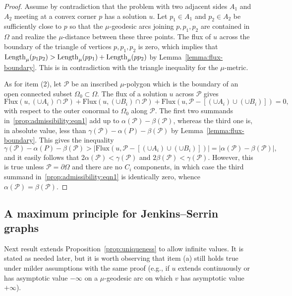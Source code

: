 \documentclass[a4paper,10pt,reqno]{amsart}
\newcommand{\Length}{\mathop{\rm Length}\nolimits}
\newcommand{\Flux}{\mathrm{Flux}}
\newcommand{\sm}{-}
\theoremstyle{definition}
\theoremstyle{remark}
\numberwithin{equation}{section}
\begin{document}
\begin{proof}
Assume by contradiction that the problem with two adjacent sides $A_1$ and $A_2$ meeting at a convex corner $p$ has a solution $u$. Let $p_1\in A_1$ and $p_2\in A_2$ be sufficiently close to $p$ so that the $\mu$-geodesic arcs joining $p,p_1,p_2$ are contained in $\Omega$ and realize the $\mu$-distance between these three points. The flux of $u$ across the boundary of the triangle of vertices $p,p_1,p_2$ is zero, which implies that $\Length_\mu(p_1p_2)>\Length_\mu(pp_1)+\Length_\mu(pp_2)$ by Lemma~\ref{lemma:flux-boundary}. This is in contradiction with the triangle inequality for the $\mu$-metric.

As for item (2), let $\mathcal P$ be an inscribed $\mu$-polygon which is the boundary of an open connected subset $\Omega_0\subset\Omega$. The flux of a solution $u$ across $\mathcal P$ gives
\begin{equation}\label{prop:admissibility:eqn1}
\Flux(u,(\cup A_i)\cap \mathcal P)+\Flux(u,(\cup B_i)\cap \mathcal P)+\Flux(u,\mathcal P\sm[(\cup A_i)\cup(\cup B_i)])=0,
\end{equation}
with respect to the outer conormal to $\Omega_0$ along $\mathcal P$. The first two summands in~\eqref{prop:admissibility:eqn1} add up to $\alpha(\mathcal P)-\beta(\mathcal P)$, whereas the third one is, in absolute value, less than $\gamma(\mathcal P)-\alpha(P)-\beta(\mathcal P)$ by Lemma~\ref{lemma:flux-boundary}. This gives the inequality
\[\gamma(\mathcal P)-\alpha(P)-\beta(\mathcal P)>|\Flux(u,\mathcal P\sm[(\cup A_i)\cup(\cup B_i)])|=|\alpha(\mathcal P)-\beta(\mathcal P)|,\]
and it easily follows that $2\alpha(\mathcal P)<\gamma(\mathcal P)$ and $2\beta(\mathcal P)<\gamma(\mathcal P)$. However, this is true unless $\mathcal P=\partial\Omega$ and there are no $C_i$ components, in which case the third summand in~\eqref{prop:admissibility:eqn1} is identically zero, whence $\alpha(\mathcal P)=\beta(\mathcal P)$.
\end{proof}


\subsection{A maximum principle for Jenkins--Serrin graphs}\label{subsec:maximum-principle}
Next result extends Proposition~\ref{prop:uniqueness} to allow infinite values. It is stated as needed later, but it is worth observing that item (a) still holds true under milder assumptions with the same proof (e.g., if $u$ extends continuously or has asymptotic value $-\infty$ on a $\mu$-geodesic arc on which $v$ has asymptotic value $+\infty$).
\end{document}

